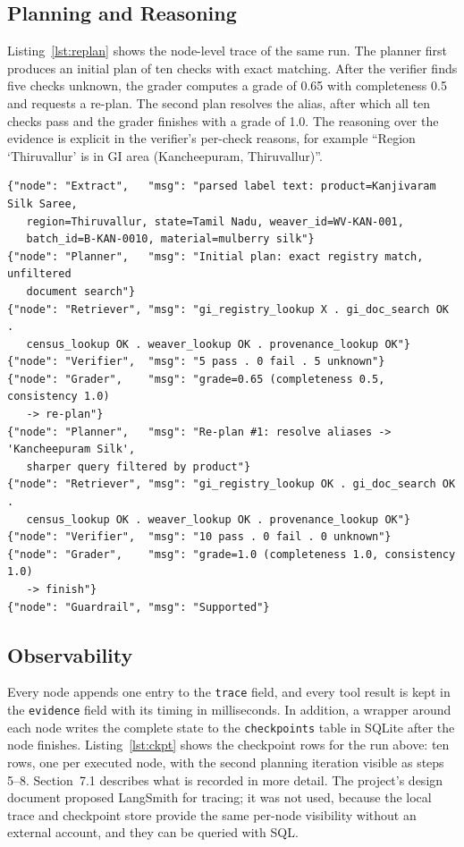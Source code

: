 \subsection{Planning and Reasoning}

Listing~\ref{lst:replan} shows the node-level trace of the same run. The planner first produces an
initial plan of ten checks with exact matching. After the verifier finds five checks unknown, the
grader computes a grade of 0.65 with completeness 0.5 and requests a re-plan. The second plan resolves
the alias, after which all ten checks pass and the grader finishes with a grade of 1.0. The reasoning
over the evidence is explicit in the verifier's per-check reasons, for example ``Region `Thiruvallur'
is in GI area (Kancheepuram, Thiruvallur)''.

\begin{lstlisting}[language={},caption={Node trace showing evidence grading and re-planning (case REPORT-TRACE-1)},label={lst:replan}]
{"node": "Extract",   "msg": "parsed label text: product=Kanjivaram Silk Saree,
   region=Thiruvallur, state=Tamil Nadu, weaver_id=WV-KAN-001,
   batch_id=B-KAN-0010, material=mulberry silk"}
{"node": "Planner",   "msg": "Initial plan: exact registry match, unfiltered
   document search"}
{"node": "Retriever", "msg": "gi_registry_lookup X . gi_doc_search OK .
   census_lookup OK . weaver_lookup OK . provenance_lookup OK"}
{"node": "Verifier",  "msg": "5 pass . 0 fail . 5 unknown"}
{"node": "Grader",    "msg": "grade=0.65 (completeness 0.5, consistency 1.0)
   -> re-plan"}
{"node": "Planner",   "msg": "Re-plan #1: resolve aliases -> 'Kancheepuram Silk',
   sharper query filtered by product"}
{"node": "Retriever", "msg": "gi_registry_lookup OK . gi_doc_search OK .
   census_lookup OK . weaver_lookup OK . provenance_lookup OK"}
{"node": "Verifier",  "msg": "10 pass . 0 fail . 0 unknown"}
{"node": "Grader",    "msg": "grade=1.0 (completeness 1.0, consistency 1.0)
   -> finish"}
{"node": "Guardrail", "msg": "Supported"}
\end{lstlisting}

\subsection{Observability}

Every node appends one entry to the \texttt{trace} field, and every tool result is kept in the
\texttt{evidence} field with its timing in milliseconds. In addition, a wrapper around each node writes
the complete state to the \texttt{checkpoints} table in SQLite after the node finishes.
Listing~\ref{lst:ckpt} shows the checkpoint rows for the run above: ten rows, one per executed node,
with the second planning iteration visible as steps 5--8. Section~7.1 describes what is recorded in
more detail. The project's design document proposed LangSmith for tracing; it was not used, because
the local trace and checkpoint store provide the same per-node visibility without an external account,
and they can be queried with SQL.

